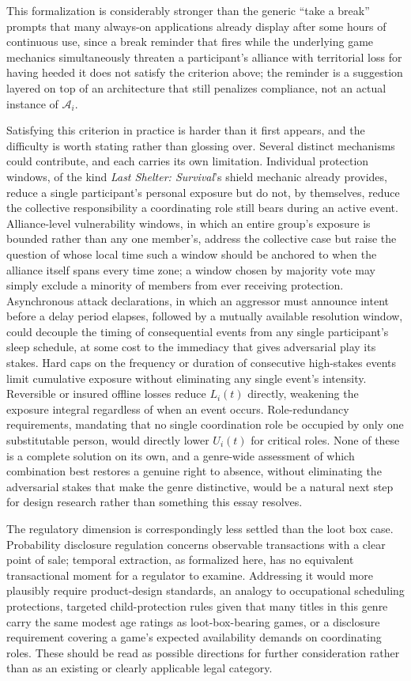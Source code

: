 \documentclass[11pt]{article}
\begin{document}
This formalization is considerably stronger than the generic ``take a break'' prompts that many always-on applications already display after some hours of continuous use, since a break reminder that fires while the underlying game mechanics simultaneously threaten a participant's alliance with territorial loss for having heeded it does not satisfy the criterion above; the reminder is a suggestion layered on top of an architecture that still penalizes compliance, not an actual instance of $\mathcal{A}_i$.

Satisfying this criterion in practice is harder than it first appears, and the difficulty is worth stating rather than glossing over. Several distinct mechanisms could contribute, and each carries its own limitation. Individual protection windows, of the kind \emph{Last Shelter: Survival}'s shield mechanic already provides, reduce a single participant's personal exposure but do not, by themselves, reduce the collective responsibility a coordinating role still bears during an active event. Alliance-level vulnerability windows, in which an entire group's exposure is bounded rather than any one member's, address the collective case but raise the question of whose local time such a window should be anchored to when the alliance itself spans every time zone; a window chosen by majority vote may simply exclude a minority of members from ever receiving protection. Asynchronous attack declarations, in which an aggressor must announce intent before a delay period elapses, followed by a mutually available resolution window, could decouple the timing of consequential events from any single participant's sleep schedule, at some cost to the immediacy that gives adversarial play its stakes. Hard caps on the frequency or duration of consecutive high-stakes events limit cumulative exposure without eliminating any single event's intensity. Reversible or insured offline losses reduce $L_i(t)$ directly, weakening the exposure integral regardless of when an event occurs. Role-redundancy requirements, mandating that no single coordination role be occupied by only one substitutable person, would directly lower $U_i(t)$ for critical roles. None of these is a complete solution on its own, and a genre-wide assessment of which combination best restores a genuine right to absence, without eliminating the adversarial stakes that make the genre distinctive, would be a natural next step for design research rather than something this essay resolves.

The regulatory dimension is correspondingly less settled than the loot box case. Probability disclosure regulation concerns observable transactions with a clear point of sale; temporal extraction, as formalized here, has no equivalent transactional moment for a regulator to examine. Addressing it would more plausibly require product-design standards, an analogy to occupational scheduling protections, targeted child-protection rules given that many titles in this genre carry the same modest age ratings as loot-box-bearing games, or a disclosure requirement covering a game's expected availability demands on coordinating roles. These should be read as possible directions for further consideration rather than as an existing or clearly applicable legal category.
\end{document}
